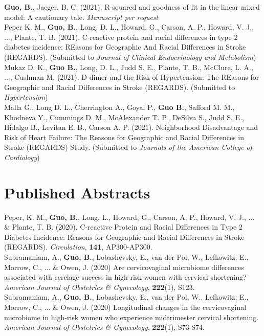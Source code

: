 \textbf{Guo, B.}, Jaeger, B. C. (2021). R-squared and goodness of fit in the linear mixed model: A cautionary tale. {\it Manuscript per request}\\

Peper K. M., \textbf{Guo, B.}, Long, D. L., Howard, G., Carson, A. P., Howard, V. J., ..., Plante, T. B. (2021). C-reactive protein and racial differences in type 2 diabetes incidence: REasons for Geographic And Racial Differences in Stroke (REGARDS). (Submitted to \textit{Journal of Clinical Endocrinology and Metabolism})\\

Mukaz D. K., \textbf{Guo B.}, Long, D. L., Judd S. E., Plante, T. B., McClure, L. A., ...,  Cushman M. (2021). D-dimer and the Risk of Hypertension: The REasons for Geographic and Racial Differences in Stroke (REGARDS). (Submitted to \textit{Hypertension})\\

Malla G., Long D. L., Cherrington A., Goyal P., \textbf{Guo B.}, Safford M. M., Khodneva Y., Cummings D. M., McAlexander T. P., DeSilva S., Judd S. E., Hidalgo B., Levitan E. B., Carson A. P. (2021). Neighborhood Disadvantage and Risk of Heart Failure: The Reasons for Geographic and Racial Differences in Stroke (REGARDS) Study. (Submitted to \textit{Journals of the American College of Cardiology})

\section{Published Abstracts}
Peper, K. M., \textbf{Guo, B.}, Long, L., Howard, G., Carson, A. P., Howard, V. J., ... \& Plante, T. B.  (2020). C-reactive Protein and Racial Differences in Type 2 Diabetes Incidence: Reasons for Geographic and Racial Differences in Stroke (REGARDS). \textit{Circulation}, {\bf 141}, AP300-AP300. \\

Subramaniam, A., \textbf{Guo, B.}, Lobashevsky, E., van der Pol, W., Lefkowitz, E., Morrow, C., ... \& Owen, J.  (2020) Are cervicovaginal microbiome differences associated with cerclage success in high-risk women with cervical shortening? \textit{American Journal of Obstetrics \& Gynecology}, {\bf 222}(1), S123.\\

Subramaniam, A., \textbf{Guo, B.}, Lobashevsky, E., van der Pol, W., Lefkowitz, E., Morrow, C., ... \& Owen, J.  (2020)  Longitudinal changes in the cervicovaginal microbiome in high-risk women who experience midtrimester cervical shortening. \textit{American Journal of Obstetrics \& Gynecology}, {\bf 222}(1), S73-S74.\\

